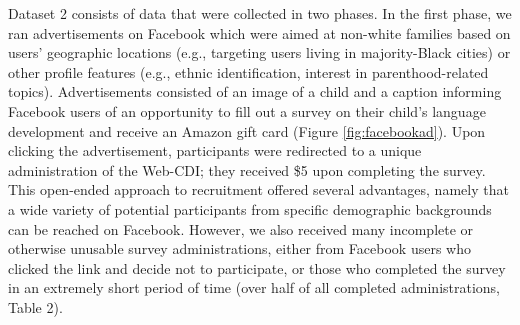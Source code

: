 \documentclass[
  english,
  ,man,floatsintext]{apa6}
\begin{document}
\begin{table}

\caption{\label{tab:unnamed-chunk-12}Exclusions from Dataset 2: recent data collection using Facebook and Prolific.}
\centering
{}
\end{table}

Dataset 2 consists of data that were collected in two phases. In the first phase, we ran advertisements on Facebook which were aimed at non-white families based on users' geographic locations (e.g., targeting users living in majority-Black cities) or other profile features (e.g., ethnic identification, interest in parenthood-related topics). Advertisements consisted of an image of a child and a caption informing Facebook users of an opportunity to fill out a survey on their child's language development and receive an Amazon gift card (Figure \ref{fig:facebookad}). Upon clicking the advertisement, participants were redirected to a unique administration of the Web-CDI; they received \$5 upon completing the survey. This open-ended approach to recruitment offered several advantages, namely that a wide variety of potential participants from specific demographic backgrounds can be reached on Facebook. However, we also received many incomplete or otherwise unusable survey administrations, either from Facebook users who clicked the link and decide not to participate, or those who completed the survey in an extremely short period of time (over half of all completed administrations, Table 2).
\end{document}
